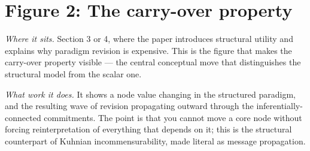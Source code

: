 \documentclass[11pt]{article}
\begin{document}
\newpage
\section*{Figure 2: The carry-over property}

\textit{Where it sits.} Section 3 or 4, where the paper introduces structural utility and explains why paradigm revision is expensive. This is the figure that makes the carry-over property visible — the central conceptual move that distinguishes the structural model from the scalar one.

\textit{What work it does.} It shows a node value changing in the structured paradigm, and the resulting wave of revision propagating outward through the inferentially-connected commitments. The point is that you cannot move a core node without forcing reinterpretation of everything that depends on it; this is the structural counterpart of Kuhnian incommensurability, made literal as message propagation.
\end{document}
